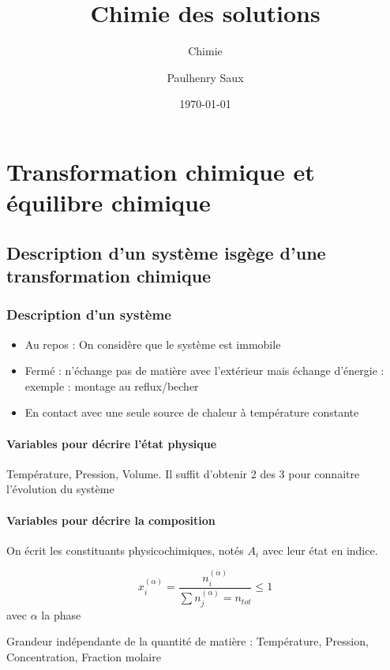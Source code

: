 \documentclass[french]{yLectureNote}
\title{Chimie des solutions}
\subtitle{Chimie}
\author{Paulhenry Saux}
\date{\today}
\begin{document}
	\chapter{Transformation chimique et équilibre chimique }
	\section{Description d'un système isgège d'une transformation chimique}
	\subsection{Description d'un système}
	\begin{itemize}
	 \item Au repos : On considère que le système est immobile
	 \item Fermé : n'échange pas de matière avec l'extérieur mais échange d'énergie : exemple : montage au reflux/becher
	 \item En contact avec une seule source de chaleur à température constante
	\end{itemize}
\subsubsection{Variables pour décrire l'état physique}
Température, Pression, Volume. Il suffit d'obtenir 2 des 3 pour connaitre l'évolution du système
\subsubsection{Variables pour décrire la composition}
On écrit les constituants physicochimiques, notés $A_i$ avec leur état en indice.

\begin{definition}
\[x_i^{(\alpha)} = \frac{n_i^{(\alpha)}}{\sum n_j^{(\alpha)} = n_{tot}} \leq 1\] avec $\alpha$ la phase
\end{definition}
\begin{definition}
Grandeur indépendante de la quantité de matière : Température, Pression, Concentration, Fraction molaire
\end{definition}
\end{document}
